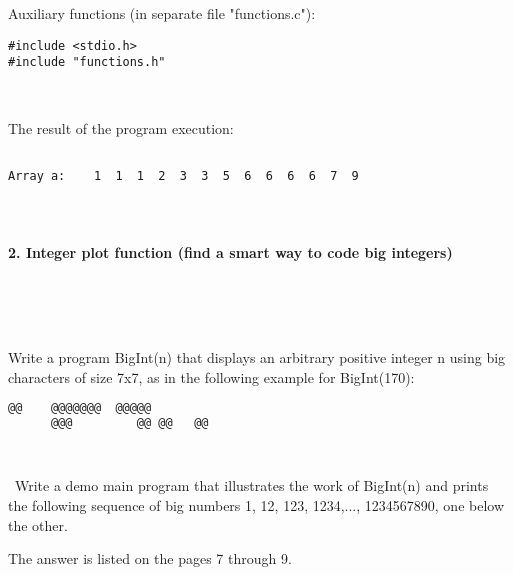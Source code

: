 \documentclass{article}
\begin{document}
\paragraph{}\

	\rmfamily
	
	Auxiliary functions (in separate file "functions.c"):
	
	\begin{verbatim} 
#include <stdio.h>
#include "functions.h"

\end{verbatim}




	
	\rmfamily\
	
		\noindent The result of the program execution:
		
	\ttfamily
	\begin{lstlisting}[language=bash]

Array a:    1  1  1  2  3  3  5  6  6  6  6  7  9

	\end{lstlisting}
	
	
\paragraph{}\

	
	
	\rmfamily
	
	\paragraph{2. Integer plot function (find a smart way to code big integers) }\
	
	\rmfamily\
	
		Write a program BigInt(n) that displays an arbitrary positive integer n using big characters of size 7x7, as in the following example for BigInt(170):
				
	\ttfamily
	\begin{lstlisting}[language=bash]		
	   @@ 	 @@@@@@@  @@@@@  
	  @@@  	      @@ @@   @@ 

		 
	\end{lstlisting}
	
	\rmfamily\
	Write a demo main program that illustrates the work of BigInt(n) and prints the following sequence of big numbers 1, 12, 123, 1234,..., 1234567890, one below the other.
	\newline
	
	The answer is listed on the pages 7 through 9.
	
\end{document}

